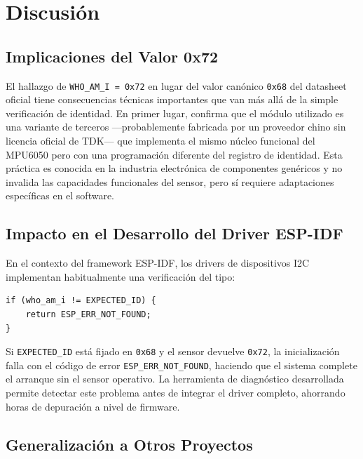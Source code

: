 \documentclass[10pt,twocolumn,a4paper]{article}
\begin{document}
\section{Discusión}
\label{sec:discusion}

\subsection{Implicaciones del Valor 0x72}

El hallazgo de \texttt{WHO\_AM\_I = 0x72} en lugar del valor canónico
\texttt{0x68} del datasheet oficial tiene consecuencias técnicas
importantes que van más allá de la simple verificación de identidad.
En primer lugar, confirma que el módulo utilizado es una variante
de terceros —probablemente fabricada por un proveedor chino sin licencia
oficial de TDK— que implementa el mismo núcleo funcional del MPU6050
pero con una programación diferente del registro de identidad. Esta
práctica es conocida en la industria electrónica de componentes genéricos
y no invalida las capacidades funcionales del sensor, pero sí requiere
adaptaciones específicas en el software.

\subsection{Impacto en el Desarrollo del Driver ESP-IDF}

En el contexto del framework ESP-IDF, los drivers de dispositivos
I2C implementan habitualmente una verificación del tipo:

\begin{lstlisting}[style=output, numbers=none]
if (who_am_i != EXPECTED_ID) {
    return ESP_ERR_NOT_FOUND;
}
\end{lstlisting}

Si \texttt{EXPECTED\_ID} está fijado en \texttt{0x68} y el sensor
devuelve \texttt{0x72}, la inicialización falla con el código de error
\texttt{ESP\_ERR\_NOT\_FOUND}, haciendo que el sistema complete el
arranque sin el sensor operativo. La herramienta de diagnóstico
desarrollada permite detectar este problema antes de integrar el driver
completo, ahorrando horas de depuración a nivel de firmware.

\subsection{Generalización a Otros Proyectos}
\end{document}
